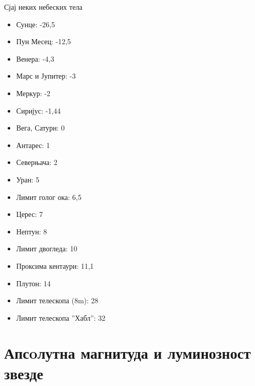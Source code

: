 \documentclass[aspectratio=169, xcolor=table, 10pt]{beamer}
\theoremstyle{definition}
\begin{document}
\begin{frame}{Сјај неких небеских тела}
  \begin{multicols}{2}
    \begin{itemize}
      \item Сунце: -26,5
      \item Пун Месец: -12,5
      \item Венера: -4,3
      \item Марс и Јупитер: -3
      \item Меркур: -2
      \item Сиријус: -1,44
      \item Вега, Сатурн: 0
      \item Антарес: 1
      \item Северњача: 2
      \item Уран: 5
      \item Лимит голог ока: 6,5
      \item Церес: 7
      \item Нептун: 8
      \item Лимит двогледа: 10
      \item Проксима кентаури: 11,1
      \item Плутон: 14
      \item Лимит телескопа (8m): 28
      \item Лимит телескопа ”Хабл”: 32
    \end{itemize}
  \end{multicols}
\end{frame}

\section{Апсoлутна магнитуда и луминозност звезде}
\end{document}

